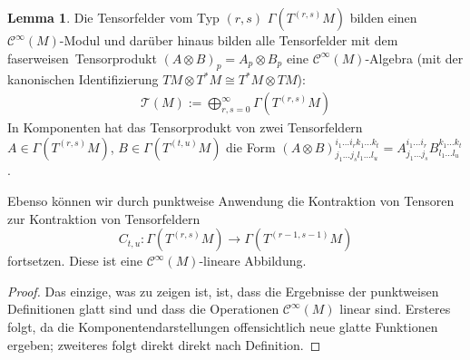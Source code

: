 \documentclass[a4paper]{scrreprt}
\numberwithin{equation}{chapter}
\newcommand{\sC}{\mathcal{C}^{\infty}}
\theoremstyle{definition}
\newtheorem{lemma}[defn]{Lemma}
\begin{document}
		\begin{lemma}
			Die Tensorfelder vom Typ $(r,s)$ $\Gamma(T^{(r,s)}M)$ bilden einen $\sC(M)$-Modul und darüber hinaus bilden alle Tensorfelder mit dem \glqq faserweisen\grqq\ Tensorprodukt $(A\otimes B)_p=A_p\otimes B_p$ eine $\sC(M)$-Algebra (mit der kanonischen Identifizierung $TM\otimes T^*M\cong T^*M\otimes TM$):
			\begin{align*}
				\mathcal{T}(M):=\bigoplus_{r,s=0}^{\infty}\Gamma(T^{(r,s)}M)
			\end{align*}
			In Komponenten hat das Tensorprodukt von zwei Tensorfeldern $A \in \Gamma(T^{(r,s)}M)$, $B \in \Gamma(T^{(t,u)}M)$ die Form $(A\otimes B)^{i_1 \dots i_r k_1 \dots k_t}_{j_1 \dots j_s l_1 \dots l_u} = A^{i_1 \dots i_r}_{j_1 \dots j_s} B^{k_1 \dots k_t}_{l_1 \dots l_u}$.
			
			Ebenso können wir durch punktweise Anwendung die Kontraktion von Tensoren zur Kontraktion von Tensorfeldern
			\[C_{t,u}\colon \Gamma(T^{(r,s)}M) \to \Gamma(T^{(r-1,s-1)}M)\]
			fortsetzen. Diese ist eine $\sC(M)$-lineare Abbildung.
			
			\begin{proof}
				Das einzige, was zu zeigen ist, ist, dass die Ergebnisse der punktweisen Definitionen glatt sind und dass die Operationen $\sC(M)$ linear sind. Ersteres folgt, da die Komponentendarstellungen offensichtlich neue glatte Funktionen ergeben; zweiteres folgt direkt direkt nach Definition.
			\end{proof}
		\end{lemma}
\end{document}
